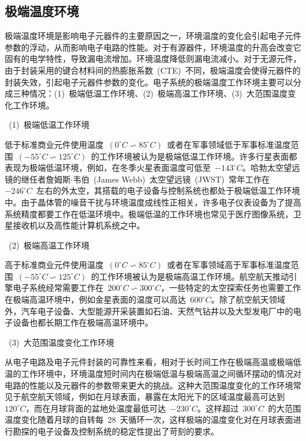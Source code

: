 \subsection{极端温度环境}
\label{sub:chap2:temperature}
极端温度环境是影响电子元器件的主要原因之一\cite{Cressler2013Extreme}，环境温度的变化会引起电子元件参数的浮动，从而影响电子电路的性能。对于有源器件，环境温度的升高会改变它固有的电学特性，导致漏电流增加。环境温度降低则漏电流减小。对于无源元件，由于封装采用的键合材料间的热膨胀系数~(CTE)~不同，极端温度会使得元器件的封装失效，引起电子元器件参数的变化。电子系统的极端温度工作环境主要可以分成三种情况：(1)~极端低温工作环境、(2)~极端高温工作环境、(3)~大范围温度变化工作环境。

\newpage
~(1)~极端低温工作环境

低于标准商业元件使用温度~$\left(0^ {\circ}C\backsim85^{\circ}C\right)$~或者在军事领域低于军事标准温度范围~$\left(-55^ {\circ}C\backsim125^{\circ}C\right)$~的工作环境被认为是极端低温工作环境\cite{Cressler2013Extreme}。许多行星表面都表现为极端低温环境，例如，在冬季火星表面温度可低至~$-143^ {\circ}C$。哈勃太空望远镜的继任者\raisebox{0.5mm}{------}詹姆斯$\cdot$韦伯~(James Webb)~太空望远镜~(JWST)~常年工作在~$-246^ {\circ}C$~左右的外太空，其搭载的电子设备与控制系统也都处于极端低温工作环境中\cite{Lightsey2004Optical}。由于晶体管的噪音干扰与环境温度成线性正相关，许多电子仪表设备为了提高系统精度都要工作在低温环境中。极端低温的工作环境也常见于医疗图像系统，卫星接收机以及高性能计算机系统之中。

~(2)~极端高温工作环境

高于标准商业元件使用温度~$\left(0^ {\circ}C\backsim85^{\circ}C\right)$~或者在军事领域高于军事标准温度范围~$\left(-55^ {\circ}C\backsim125^{\circ}C\right)$~的工作环境被认为是极端高温工作环境\cite{Cressler2013Extreme}。航空航天推动引擎电子系统经常需要工作在~$200^ {\circ}C\backsim300^{\circ}C$，一些特定的太空探索任务也需要工作在极端高温环境中，例如金星表面的温度可以高达~$600^ {\circ}C$。除了航空航天领域外，汽车电子设备、大型能源开采装置如石油、天然气钻井以及大型发电厂中的电子设备也都长期工作在极端高温环境中\cite{Johnson2002High}。

~(3)~大范围温度变化工作环境

从电子电路及电子元件封装的可靠性来看，相对于长时间工作在极端高温或极端低温的工作环境中，环境温度短时间内在极端低温与极端高温之间循环摆动的情况对电路的性能以及元器件的参数带来更大的挑战。这种大范围温度变化的工作环境常见于航空航天领域，例如在月球表面\cite{Jaeger1953Conduction}，暴露在太阳光下的区域温度最高可达到~$120^{\circ}C$，而在月球背面的盆地处温度最低可达~$-230^{\circ}C$。这样超过~$300^{\circ}C$~的大范围温度变化随着月球的自转每~28~天循环一次，这样极端的温度变化对在月球表面进行勘探的电子设备及控制系统的稳定性提出了苛刻的要求。


